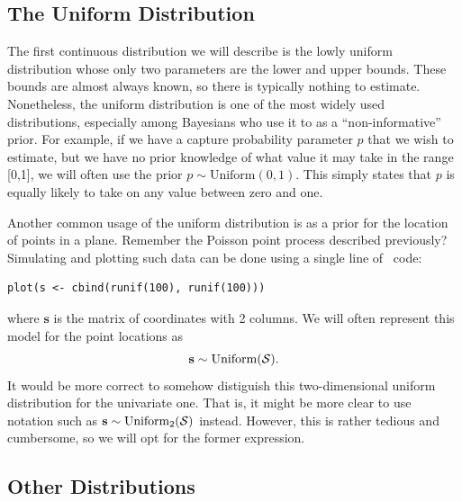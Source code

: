 \subsection{The Uniform Distribution}

The first continuous distribution we will describe is
the lowly uniform distribution whose
only two parameters are the lower and upper bounds. These bounds
are almost always known, so there is typically nothing to
estimate. Nonetheless, the uniform
distribution is one of the most widely used distributions,
especially among Bayesians who use it to as a ``non-informative''
prior. For example, if we
have a capture probability parameter $p$ that we wish to estimate, but
we have no prior knowledge of what value it may take in the range
[0,1], we will often use the prior $p \sim \text{Uniform}(0,1)$. This
simply states that $p$ is equally likely to take on any value between
zero and one.

Another common usage of the uniform distribution is as a prior for the
location of points in a plane. Remember the Poisson point process
described previously? Simulating and plotting such data can be done
using a single line of \R~code:
\begin{verbatim}
plot(s <- cbind(runif(100), runif(100)))
\end{verbatim}
where $\mathbf{s}$ is the matrix of coordinates with 2 columns. We
will often represent this model for the point locations as
\begin{equation}
  {\bf s} \sim \text{Uniform}(\mathcal{S}).
\end{equation}
It would be more correct to somehow distiguish this
two-dimensional uniform distribution for the univariate one. That is,
it might be more clear to use notation such as
${\bf s} \sim \text{Uniform}_2(\mathcal{S})$ instead. However, this is rather
tedious and cumbersome, so we will opt for the former expression.




\subsection{Other Distributions}


